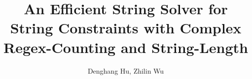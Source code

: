 \documentclass[preprint,12pt]{elsarticle}
\begin{document}
\begin{frontmatter}



\title{An Efficient String Solver for String Constraints with Complex Regex-Counting and String-Length}


\author{Denghang Hu,
Zhilin Wu} %


\begin{abstract}

\end{abstract}




\end{frontmatter}
\end{document}
